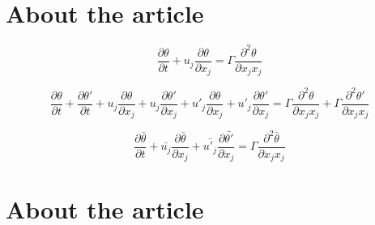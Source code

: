 \documentclass{article}
\begin{document}
\section{About the article}

\begin{equation}
    \frac{\partial \theta}{\partial t}
    + u_j\frac{\partial \theta}{\partial x_j} = 
    \Gamma\frac{\partial^2 \theta}{\partial x_j x_j}
\end{equation}

\begin{equation}
    \frac{\partial \theta}{\partial t}
    + \frac{\partial \theta'}{\partial t}
    + u_j\frac{\partial \theta}{\partial x_j}
    + u_j\frac{\partial \theta'}{\partial x_j}
    + u'_j\frac{\partial \theta}{\partial x_j}
    + u'_j\frac{\partial \theta'}{\partial x_j} = 
    \Gamma\frac{\partial^2 \theta}{\partial x_j x_j}
    + \Gamma\frac{\partial^2 \theta'}{\partial x_j x_j}
\end{equation}

\begin{equation}
    \frac{\partial \bar{\theta}}{\partial t}
    + \bar{u_j}\frac{\partial \bar{\theta}}{\partial x_j}
    + \bar{u'_j}\frac{\partial \bar{\theta'}}{\partial x_j} = 
    \Gamma\frac{\partial^2 \bar{\theta}}{\partial x_j x_j}
\end{equation}

\section{About the article}
\end{document}
